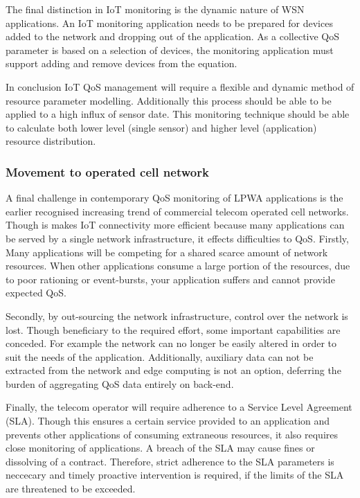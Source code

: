 The final distinction in IoT monitoring is the dynamic nature of WSN applications. An IoT monitoring application needs to be prepared for devices added to the network and dropping out of the application. As a collective QoS parameter is based on a selection of devices, the monitoring application must support adding and remove devices from the equation.

In conclusion IoT QoS management will require a flexible and dynamic method of resource parameter modelling. Additionally this process should be able to be applied to a high influx of sensor date. This monitoring technique should be able to calculate both lower level (single sensor) and higher level (application) resource distribution.

\subsubsection{Movement to operated cell network}
A final challenge in contemporary QoS monitoring of LPWA applications is the earlier recognised increasing trend of commercial telecom operated cell networks. Though is makes IoT connectivity more efficient because many applications can be served by a single network infrastructure, it  effects difficulties to QoS. Firstly, Many applications will be competing for a shared scarce amount of network resources. When other applications consume a large portion of the resources, due to poor rationing or event-bursts, your application suffers and cannot provide expected QoS.

Secondly, by out-sourcing the network infrastructure, control over the network is lost. Though beneficiary to the required effort, some important capabilities are conceded. For example the network can no longer be easily altered in order to suit the needs of the application. Additionally, auxiliary data can not be extracted from the network and edge computing is not an option, deferring the burden of aggregating QoS data entirely on back-end.

Finally, the telecom operator will require adherence to a Service Level Agreement (SLA). Though this ensures a certain service provided to an application and prevents other applications of consuming extraneous resources, it also requires close monitoring of applications. A breach of the SLA may cause fines or dissolving of a contract. Therefore, strict adherence to the SLA parameters is neccecary and timely proactive intervention is required, if the limits of the SLA are threatened to be exceeded. \cite{cloud-computing-monitoring}

